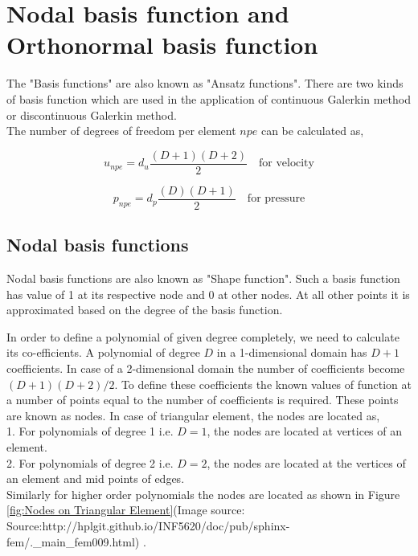 \documentclass[a4paper,openany]{book}
\begin{document}
\section[Basis function]{Nodal basis function and Orthonormal basis function}

The "Basis functions" are also known as "Ansatz functions". There are two kinds of basis function which are used in the application of continuous Galerkin method or discontinuous Galerkin method. \\

The number of degrees of freedom per element $npe$ can be calculated as,

\begin{equation} \label{unpe}
u_{npe} = d_u \frac{(D+1)(D+2)}{2} \quad \textrm{for velocity}
\end{equation} 

\begin{equation} \label{pnpe}
p_{npe} = d_p \frac{(D)(D+1)}{2} \quad \textrm{for pressure}
\end{equation} 


\subsection{Nodal basis functions}

Nodal basis functions are also known as "Shape function". Such a basis function has value of 1 at its respective node and 0 at other nodes. At all other points it is approximated based on the degree of the basis function. 

In order to define a polynomial of given degree completely, we need to calculate its co-efficients. A polynomial of degree $D$ in a 1-dimensional domain has $D+1$ coefficients. In case of a 2-dimensional domain the number of coefficients become $(D+1)(D+2)/2$. To define these coefficients the known values of function at a number of points equal to the number of coefficients is required. These points are known as nodes. In case of triangular element, the nodes are located as,\\
1. For polynomials of degree 1 i.e. $D=1$, the nodes are located at vertices of an element.\\
2. For polynomials of degree 2 i.e. $D=2$, the nodes are located at the vertices of an element and mid points of edges.\\
Similarly for higher order polynomials the nodes are located as shown in Figure \ref{fig:Nodes on Triangular Element}(Image source: Source:http://hplgit.github.io/INF5620/doc/pub/sphinx-fem/.\_main\_fem009.html)  . 
\end{document}
